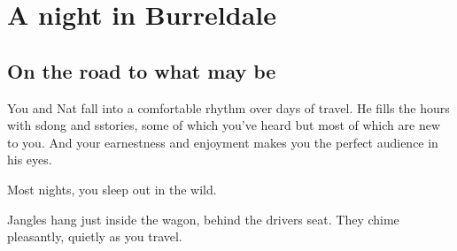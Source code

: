 \section{A night in Burreldale}


\begin{multicols}{2}
  \subsection{On the road to what may be}
  \begin{aloud}
    You and Nat fall into a comfortable rhythm over days of travel.
    He fills the hours with sdong and sstories, some of which you've heard but most of which are new to you.
    And your earnestness and enjoyment makes you the perfect audience in his eyes.

    Most nights, you sleep out in the wild.

    Jangles hang just inside the wagon, behind the drivers seat.
    They chime pleasantly, quietly as you travel.
  \end{aloud}


\end{multicols}
